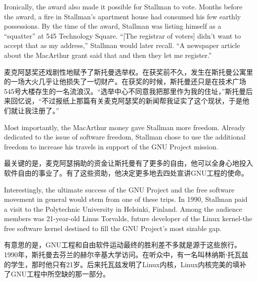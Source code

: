 \ifdefined\eng
Ironically, the award also made it possible for Stallman to vote. Months before the award, a fire in Stallman's apartment house had consumed his few earthly possessions. By the time of the award, Stallman was listing himself as a ``squatter'' at 545 Technology Square. ``[The registrar of voters] didn't want to accept that as my address,'' Stallman would later recall. ``A newspaper article about the MacArthur grant said that and then they let me register.''
\fi

\ifdefined\chs
麦克阿瑟奖还戏剧性地赋予了斯托曼选举权。在获奖前不久，发生在斯托曼公寓里的一场大火几乎让他损失了一切财产。在获奖的时候，斯托曼还只是在技术广场545号大楼存生的一名流浪汉。``选举中心不同意我把那里作为我的住址，''斯托曼后来回忆说，``不过报纸上那篇有关麦克阿瑟奖的新闻帮我证实了这个现状，于是他们就让我注册了。''
\fi

\ifdefined\eng
Most importantly, the MacArthur money gave Stallman more freedom. Already dedicated to the issue of software freedom, Stallman chose to use the additional freedom to increase his travels in support of the GNU Project mission.
\fi

\ifdefined\chs
最关键的是，麦克阿瑟捐助的资金让斯托曼有了更多的自由，他可以全身心地投入软件自由的事业了。有了这些资助，他决定更多地去四处宣讲GNU工程的使命。
\fi

\ifdefined\eng
Interestingly, the ultimate success of the GNU Project and the free software movement in general would stem from one of these trips. In 1990, Stallman paid a visit to the Polytechnic University in Helsinki, Finland. Among the audience members was 21-year-old Linus Torvalds, future developer of the Linux kernel-the free software kernel destined to fill the GNU Project's most sizable gap.
\fi

\ifdefined\chs
有意思的是，GNU工程和自由软件运动最终的胜利差不多就是源于这些旅行。1990年，斯托曼去芬兰的赫尔辛基大学访问。在听众中，有一名叫林纳斯⋅托瓦兹的学生，那时他只有21岁。后来托瓦兹发明了Linux内核，Linux内核完美的填补了GNU工程中所空缺的那一部分。
\fi

